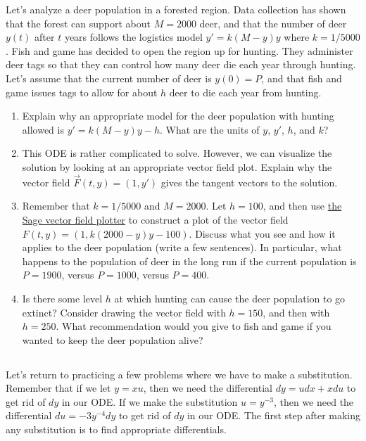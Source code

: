 \begin{problem}
Let's analyze a deer population in a forested region. Data collection has shown that the forest can support about $M=2000$ deer, and that the number of deer $y(t)$ after $t$ years follows the logistics model $y' = k(M-y)y$ where $k = 1/5000$. Fish and game has decided to open the region up for hunting. They administer deer tags so that they can control how many deer die each year through hunting. Let's assume that the current number of deer is $y(0)=P$, and that fish and game issues tags to allow for about $h$ deer to die each year from hunting. 
\begin{enumerate}
 \item Explain why an appropriate model for the deer population with hunting allowed is $y' = k(M-y)y-h$. What are the units of $y$, $y'$, $h$, and $k$?
 \item This ODE is rather complicated to solve. However, we can visualize the solution by looking at an appropriate vector field plot.  Explain why the vector field $\vec F(t,y) = (1, y')$ gives the tangent vectors to the solution. 
 \item Remember that $k=1/5000$ and $M=2000$.  Let $h=100$, and then use \href{\urlvectorfieldplotter}{the Sage vector field plotter} to construct a plot of the vector field $F(t,y) = (1,k(2000-y)y-100)$. Discuss what you see and how it applies to the deer population (write a few sentences). In particular, what happens to the population of deer in the long run if the current population is $P=1900$, versus $P=1000$, versus $P=400$. 
 \item Is there some level $h$ at which hunting can cause the deer population to go extinct? Consider drawing the vector field with $h=150$, and then with $h=250$. What recommendation would you give to fish and game if you wanted to keep the deer population alive? 
\end{enumerate}
\end{problem}



\subsection*{\ideaD}
Let's return to practicing a few problems where we have to make a substitution.  Remember that if we let $y=xu$, then we need the differential $dy=udx+xdu$ to get rid of $dy$ in our ODE. If we make the substitution $u=y^{-3}$, then we need the differential $du=-3y^{-4}dy$ to get rid of $dy$ in our ODE.  The first step after making any substitution is to find appropriate differentials. 



